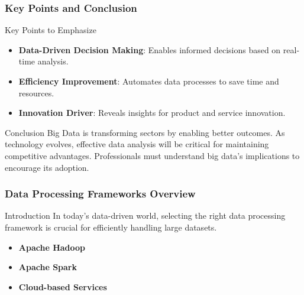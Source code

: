 \documentclass[aspectratio=169]{beamer}
\begin{document}
\begin{frame}[fragile]
    \frametitle{Key Points and Conclusion}
    \begin{block}{Key Points to Emphasize}
        \begin{itemize}
            \item \textbf{Data-Driven Decision Making}: Enables informed decisions based on real-time analysis.
            \item \textbf{Efficiency Improvement}: Automates data processes to save time and resources.
            \item \textbf{Innovation Driver}: Reveals insights for product and service innovation.
        \end{itemize}
    \end{block}

    \begin{block}{Conclusion}
        Big Data is transforming sectors by enabling better outcomes. As technology evolves, effective data analysis will be critical for maintaining competitive advantages. Professionals must understand big data's implications to encourage its adoption.
    \end{block}
\end{frame}

\begin{frame}[fragile]
    \frametitle{Data Processing Frameworks Overview}
    \begin{block}{Introduction}
        In today's data-driven world, selecting the right data processing framework is crucial for efficiently handling large datasets.
    \end{block}
    \begin{itemize}
        \item \textbf{Apache Hadoop}
        \item \textbf{Apache Spark}
        \item \textbf{Cloud-based Services}
    \end{itemize}
\end{frame}
\end{document}
